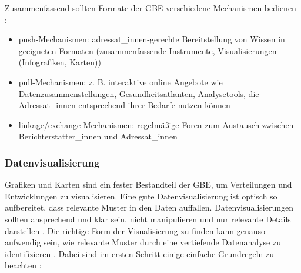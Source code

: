 \documentclass{article}
\begin{document}
Zusammenfassend sollten Formate der GBE verschiedene Mechanismen bedienen  \autocite{BlessingVictoriaundweitere2017}: 

\begin{itemize}
\item push-Mechanismen: adressat\_innen-gerechte Bereitstellung von Wissen in geeigneten Formaten (zusammenfassende Instrumente, Visualisierungen (Infografiken, Karten))


\item pull-Mechanismen: z. B. interaktive online Angebote wie Datenzusammenstellungen, Gesundheitsatlanten, Analysetools, die Adressat\_innen entsprechend ihrer Bedarfe nutzen können


\item linkage/exchange-Mechanismen: regelmäßige Foren zum Austausch zwischen Berichterstatter\_innen und Adressat\_innen


\end{itemize}

\subsubsection{Datenvisualisierung}\label{H3589257}



Grafiken und Karten sind ein fester Bestandteil der GBE, um Verteilungen und Entwicklungen zu visualisieren. Eine gute Datenvisualisierung ist optisch so aufbereitet, dass relevante Muster in den Daten auffallen. Datenvisualisierungen sollten ansprechend und klar sein, nicht manipulieren und nur relevante Details darstellen \autocite{CairoAlberto2016}. Die richtige Form der Visualisierung zu finden kann genauso aufwendig sein, wie relevante Muster durch eine vertiefende Datenanalyse zu identifizieren \autocite{NussbaumerKnaflicCole2015}. Dabei sind im ersten Schritt einige einfache Grundregeln zu beachten \autocite{CairoAlberto2016} \autocite{FewStephen2012}: 
\end{document}
